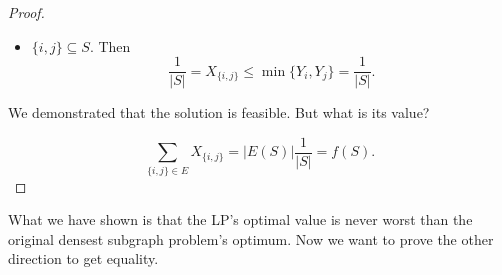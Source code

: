 \begin{proof}
\begin{itemize}
\item $\{i, j\} \subseteq S$. Then \begin{equation}
\frac{1}{|S|} = X_{\{i, j\}} \leq  \min{\{Y_i, Y_j\}} = \frac{1}{|S|}.
\end{equation}
\end{itemize}

We demonstrated that the solution is feasible. But what is its value?

\begin{equation}
\sum_{\{i, j\} \in E} X_{\{i, j\}}= |E(S)| \frac{1}{|S|} = f(S).
\end{equation}
\end{proof}

What we have shown is that the LP's optimal value is never worst than the original densest subgraph problem's optimum. Now we want to prove the other direction to get equality.

